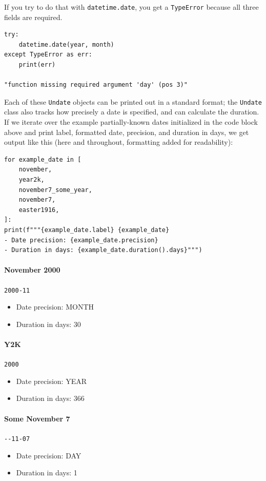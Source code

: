 \documentclass{anthology-ch}         %
\begin{document}
If you try to do that with \texttt{datetime.date}, you get a
\texttt{TypeError} because all three fields are required.

\begin{verbatim}
try:
    datetime.date(year, month)
except TypeError as err:
    print(err)

"function missing required argument 'day' (pos 3)"
\end{verbatim}


Each of these \texttt{Undate} objects can be printed out in a standard
format; the \texttt{Undate} class also tracks how precisely a date is
specified, and can calculate the duration.  If we iterate over the
example partially-known dates initialized in the code block above and print label, formatted date, precision, and duration in days, we get output like this (here and throughout, formatting added for readability):

\begin{verbatim}
for example_date in [
    november,
    year2k,
    november7_some_year,
    november7,
    easter1916,
]:
print(f"""{example_date.label} {example_date}
- Date precision: {example_date.precision}
- Duration in days: {example_date.duration().days}""")
\end{verbatim}

\paragraph{November 2000} \texttt{2000-11}
\begin{itemize}
    \item Date precision: MONTH
    \item Duration in days: 30
\end{itemize}

\paragraph{Y2K} \texttt{2000}
\begin{itemize}
    \item Date precision: YEAR
    \item Duration in days: 366
\end{itemize}

\paragraph{Some November 7} \texttt{-}\texttt{-11-07}
\begin{itemize}
   \item  Date precision: DAY
   \item Duration in days: 1
\end{itemize}
\end{document}
